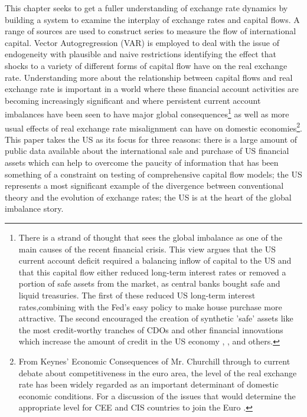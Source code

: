\documentclass[12pt, a4paper, oneside]{article}\usepackage[]{graphicx}\usepackage[]{color}
\begin{document}
This chapter seeks to get a fuller understanding of exchange rate dynamics by building a system to examine the interplay of exchange rates and capital flows.  A range of sources are used to construct series to measure the flow of international capital.   Vector Autogregression (VAR) is employed to deal with the issue of endogeneity with plausible and naive restrictions identifying the effect that shocks to a variety of different forms of capital flow have on the real exchange rate.   Understanding more about the relationship between capital flows and real exchange rate is important in a world where these financial account activities are becoming increasingly significant and where persistent current account imbalances have been seen to have major global consequences\footnote{There is a strand of thought that sees the global imbalance as one of the main causes of the recent financial crisis.  This view argues that the US current account deficit required a balancing inflow of capital to the US and that this capital flow either reduced long-term interest rates or removed a portion of safe assets from the market, as central banks bought safe and liquid treasuries.  The first of these reduced US long-term interest rates,combining with the Fed's easy policy to make house purchase more attractive.  The second encouraged the creation of synthetic 'safe' assets like the most credit-worthy tranches of CDOs and other financial innovations which increase the amount of credit in the US economy \citep{Eichengreen2006Global}, \citep{Obstfeld2009Global}, \citep{Portes2009Global} and others.} as well as more usual effects of real exchange rate misalignment can have on domestic economies\footnote{\label{note1}From Keynes' Economic Consequences of Mr. Churchill \citep{Keynes1925Churchill} through to current debate about competitiveness in the euro area, the level of the real exchange rate has been widely regarded as an important determinant of domestic economic conditions.  For a discussion of the issues that would determine the appropriate level for CEE and CIS countries to join the Euro \citep{Jens}.}.  This paper takes the US as its focus for three reasons:  there is a large amount of public data available about the international sale and purchase of US financial assets which can help to overcome the paucity of information that has been something of a constraint on testing of comprehensive capital flow models; the US represents a most significant example of the divergence between conventional theory and the evolution of exchange rates;  the US is at the heart of the global imbalance story.  
\end{document}
